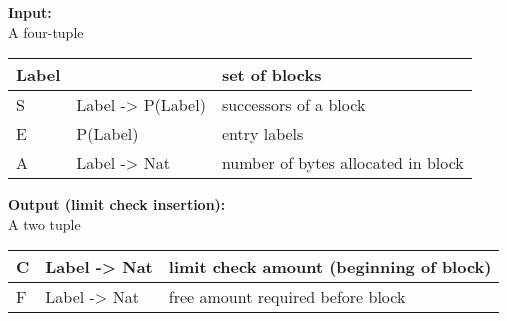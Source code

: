 \noindent\textbf{Input:}\\
\noindent A four-tuple

\begin{tabular}{|l|l|l|}
  \hline
  Label	&		   &	set of blocks\\\hline
  S	& Label -> P(Label)&	successors of a block\\\hline
  E	& P(Label)	   &	entry labels\\\hline
  A	& Label -> Nat	   &	number of bytes allocated in block\\\hline
\end{tabular}

\noindent\textbf{Output (limit check insertion):}\\
\noindent A two tuple

\begin{tabular}{|l|l|l|}
  \hline
  C	& Label -> Nat		& limit check amount (beginning of block)\\\hline
  F	& Label -> Nat		& free amount required before block\\
  \hline
\end{tabular}

